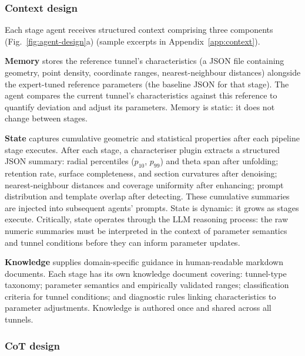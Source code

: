 \documentclass[a4paper,fleqn]{cas-dc}
\begin{document}
\subsubsection{Context design}\label{sec:context-comp}

Each stage agent receives structured context comprising three components (Fig.~\ref{fig:agent-design}a) (sample excerpts in Appendix~\ref{app:context}).

\textbf{Memory} stores the reference tunnel's characteristics (a JSON file containing geometry, point density, coordinate ranges, nearest-neighbour distances) alongside the expert-tuned reference parameters (the baseline JSON for that stage). The agent compares the current tunnel's characteristics against this reference to quantify deviation and adjust its parameters. Memory is static: it does not change between stages.

\textbf{State} captures cumulative geometric and statistical properties after each pipeline stage executes. After each stage, a characteriser plugin extracts a structured JSON summary: radial percentiles ($p_{10}$, $p_{99}$) and theta span after unfolding; retention rate, surface completeness, and section curvatures after denoising; nearest-neighbour distances and coverage uniformity after enhancing; prompt distribution and template overlap after detecting. These cumulative summaries are injected into subsequent agents' prompts. State is dynamic: it grows as stages execute. Critically, state operates through the LLM reasoning process: the raw numeric summaries must be interpreted in the context of parameter semantics and tunnel conditions before they can inform parameter updates.

\textbf{Knowledge} supplies domain-specific guidance in human-readable markdown documents. Each stage has its own knowledge document covering: tunnel-type taxonomy; parameter semantics and empirically validated ranges; classification criteria for tunnel conditions; and diagnostic rules linking characteristics to parameter adjustments. Knowledge is authored once and shared across all tunnels.

\subsubsection{CoT design}\label{sec:cot}
\end{document}
